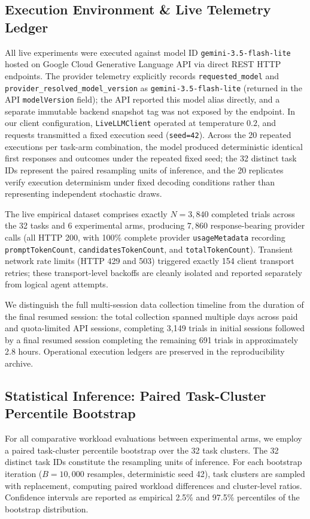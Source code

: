 \subsection{Execution Environment \& Live Telemetry Ledger}
All live experiments were executed against model ID \texttt{gemini-3.5-flash-lite} hosted on Google Cloud Generative Language API via direct REST HTTP endpoints. The provider telemetry explicitly records \texttt{requested\_model} and \texttt{provider\_resolved\_model\_version} as \texttt{gemini-3.5-flash-lite} (returned in the API \texttt{modelVersion} field); the API reported this model alias directly, and a separate immutable backend snapshot tag was not exposed by the endpoint. In our client configuration, \texttt{LiveLLMClient} operated at temperature $0.2$, and requests transmitted a fixed execution seed (\texttt{seed=42}). Across the 20 repeated executions per task-arm combination, the model produced deterministic identical first responses and outcomes under the repeated fixed seed; the 32 distinct task IDs represent the paired resampling units of inference, and the 20 replicates verify execution determinism under fixed decoding conditions rather than representing independent stochastic draws. 

The live empirical dataset comprises exactly $N=3,840$ completed trials across the 32 tasks and 6 experimental arms, producing $7,860$ response-bearing provider calls (all HTTP 200, with 100\% complete provider \texttt{usageMetadata} recording \texttt{promptTokenCount}, \texttt{candidatesTokenCount}, and \texttt{totalTokenCount}). Transient network rate limits (HTTP 429 and 503) triggered exactly 154 client transport retries; these transport-level backoffs are cleanly isolated and reported separately from logical agent attempts. 

We distinguish the full multi-session data collection timeline from the duration of the final resumed session: the total collection spanned multiple days across paid and quota-limited API sessions, completing 3,149 trials in initial sessions followed by a final resumed session completing the remaining 691 trials in approximately 2.8 hours. Operational execution ledgers are preserved in the reproducibility archive.

\subsection{Statistical Inference: Paired Task-Cluster Percentile Bootstrap}
For all comparative workload evaluations between experimental arms, we employ a paired task-cluster percentile bootstrap over the 32 task clusters. The 32 distinct task IDs constitute the resampling units of inference. For each bootstrap iteration ($B=10,000$ resamples, deterministic seed 42), task clusters are sampled with replacement, computing paired workload differences and cluster-level ratios. Confidence intervals are reported as empirical 2.5\% and 97.5\% percentiles of the bootstrap distribution.

